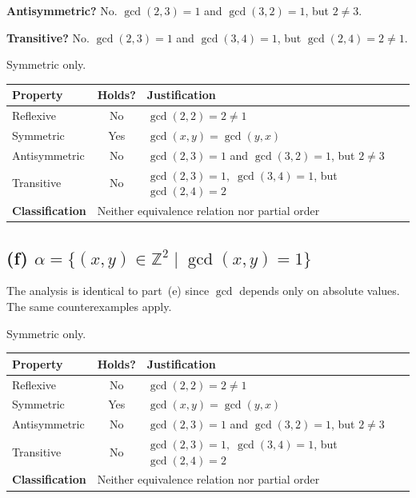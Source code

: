 \documentclass[12pt, a4paper]{article}
\newcommand{\Z}{\mathbb{Z}}
\begin{document}
\textbf{Antisymmetric?} No.  $\gcd(2,3) = 1$ and $\gcd(3,2) = 1$, but $2 \ne 3$.

\textbf{Transitive?} No.  $\gcd(2,3) = 1$ and $\gcd(3,4) = 1$, but $\gcd(2,4) = 2 \ne 1$.

\begin{answerbox}
Symmetric only.
\end{answerbox}

\begin{center}
\renewcommand{\arraystretch}{1.15}
\begin{tabular}{l|c|l}
  \toprule
  \textbf{Property} & \textbf{Holds?} & \textbf{Justification} \\
  \midrule
  Reflexive      & No  & $\gcd(2,2)=2\ne 1$ \\
  Symmetric      & Yes & $\gcd(x,y)=\gcd(y,x)$ \\
  Antisymmetric  & No  & $\gcd(2,3)=1$ and $\gcd(3,2)=1$, but $2\ne 3$ \\
  Transitive     & No  & $\gcd(2,3)=1,\;\gcd(3,4)=1$, but $\gcd(2,4)=2$ \\
  \midrule
  \textbf{Classification} & \multicolumn{2}{l}{Neither equivalence relation nor partial order} \\
  \bottomrule
\end{tabular}
\end{center}

\subsection*{(f)\; $\alpha = \{(x,y) \in \Z^2 \mid \gcd(x,y) = 1\}$}

The analysis is identical to part~(e) since $\gcd$ depends only on absolute values.  The same counterexamples apply.

\begin{answerbox}
Symmetric only.
\end{answerbox}

\begin{center}
\renewcommand{\arraystretch}{1.15}
\begin{tabular}{l|c|l}
  \toprule
  \textbf{Property} & \textbf{Holds?} & \textbf{Justification} \\
  \midrule
  Reflexive      & No  & $\gcd(2,2)=2\ne 1$ \\
  Symmetric      & Yes & $\gcd(x,y)=\gcd(y,x)$ \\
  Antisymmetric  & No  & $\gcd(2,3)=1$ and $\gcd(3,2)=1$, but $2\ne 3$ \\
  Transitive     & No  & $\gcd(2,3)=1,\;\gcd(3,4)=1$, but $\gcd(2,4)=2$ \\
  \midrule
  \textbf{Classification} & \multicolumn{2}{l}{Neither equivalence relation nor partial order} \\
  \bottomrule
\end{tabular}
\end{center}
\end{document}
